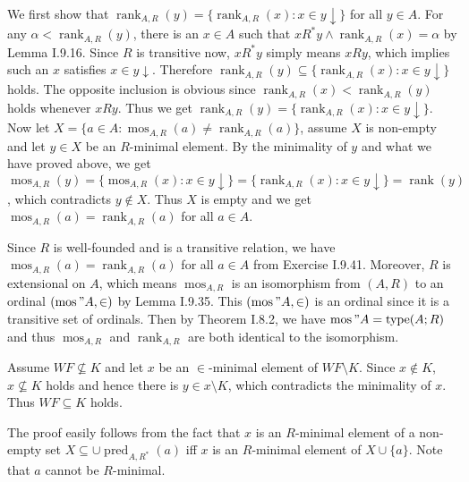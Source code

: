 \documentclass[12pt]{article}
\newcommand{\type}{\mathop{\mathrm{type}}}
\newcommand{\pred}{\mathop{\mathrm{pred}}}
\newcommand{\rank}{\mathop{\mathrm{rank}}}
\newcommand{\mos}{\mathop{\mathrm{mos}}}
\theoremstyle{definition}
\newenvironment{customthm}[1]
  {\renewcommand\theinnercustomthm{#1}\innercustomthm}
  {\endinnercustomthm}
\begin{document}
\begin{customthm}{I.9.41}
  We first show that $\rank_{A,R}(y)=\{\rank_{A,R}(x):x\in y\downarrow\}$ for all $y\in A$. For any $\alpha<\rank_{A,R}(y)$, there is an $x\in A$ such that $xR^*y\wedge\rank_{A,R}(x)=\alpha$ by Lemma I.9.16. Since $R$ is transitive now, $xR^*y$ simply means $xRy$, which implies such an $x$ satisfies $x\in y\downarrow$. Therefore $\rank_{A,R}(y)\subseteq\{\rank_{A,R}(x):x\in y\downarrow\}$ holds. The opposite inclusion is obvious since $\rank_{A,R}(x)<\rank_{A,R}(y)$ holds whenever $xRy$. Thus we get $\rank_{A,R}(y)=\{\rank_{A,R}(x):x\in y\downarrow\}$. Now let $X=\{a\in A:\mos_{A,R}(a)\neq\rank_{A,R}(a)\}$, assume $X$ is non-empty and let $y\in X$ be an $R$-minimal element. By the minimality of $y$ and what we have proved above, we get $\mos_{A,R}(y)=\{\mos_{A,R}(x):x\in y\downarrow\}=\{\rank_{A,R}(x):x\in y\downarrow\}=\rank(y)$, which contradicts $y\notin X$. Thus $X$ is empty and we get $\mos_{A,R}(a)=\rank_{A,R}(a)$ for all $a\in A$.
\end{customthm}

\begin{customthm}{I.9.42}
  Since $R$ is well-founded and is a transitive relation, we have $\mos_{A,R}(a)=\rank_{A,R}(a)$ for all $a\in A$ from Exercise I.9.41. Moreover, $R$ is extensional on $A$, which means $\mos_{A,R}$ is an isomorphism from $(A,R)$ to an ordinal $(\mos"A,\in)$ by Lemma I.9.35. This $(\mos"A,\in)$ is an ordinal since it is a transitive set of ordinals. Then by Theorem I.8.2, we have $\mos"A=\type(A;R)$ and thus $\mos_{A,R}$ and $\rank_{A,R}$ are both identical to the isomorphism.
\end{customthm}

\begin{customthm}{I.9.43}
  Assume $WF\nsubseteq K$ and let $x$ be an $\in$-minimal element of $WF\setminus K$. Since $x\notin K$, $x\nsubseteq K$ holds and hence there is $y\in x\setminus K$, which contradicts the minimality of $x$. Thus $WF\subseteq K$ holds.
\end{customthm}

\begin{customthm}{I.9.44}
  The proof easily follows from the fact that $x$ is an $R$-minimal element of a non-empty set $X\subseteq\cup\pred_{A,R^*}(a)$ iff $x$ is an $R$-minimal element of $X\cup\{a\}$. Note that $a$ cannot be $R$-minimal.
\end{customthm}
\end{document}
